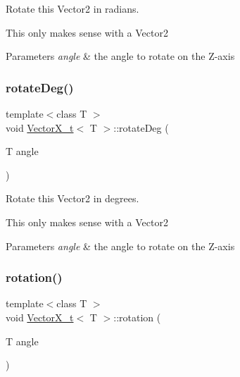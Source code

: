 Rotate this Vector2 in radians. 

This only makes sense with a Vector2


\begin{DoxyParams}{Parameters}
{\em angle} & the angle to rotate on the Z-\/axis \\
\hline
\end{DoxyParams}
\mbox{\label{class_vector_x__t_a06dd763262cfd0779011a0a292ba2143}} 
\subsubsection{\texorpdfstring{rotate\+Deg()}{rotateDeg()}}
{\footnotesize\ttfamily template$<$class T $>$ \\
void \hyperlink{class_vector_x__t}{Vector\+X\+\_\+t}$<$ T $>$\+::rotate\+Deg (\begin{DoxyParamCaption}\item[{T}]{angle }\end{DoxyParamCaption})}



Rotate this Vector2 in degrees. 

This only makes sense with a Vector2


\begin{DoxyParams}{Parameters}
{\em angle} & the angle to rotate on the Z-\/axis \\
\hline
\end{DoxyParams}
\mbox{\label{class_vector_x__t_a3ff22c065f96081f36844f175822117b}} 
\subsubsection{\texorpdfstring{rotation()}{rotation()}}
{\footnotesize\ttfamily template$<$class T $>$ \\
void \hyperlink{class_vector_x__t}{Vector\+X\+\_\+t}$<$ T $>$\+::rotation (\begin{DoxyParamCaption}\item[{T}]{angle }\end{DoxyParamCaption})}



